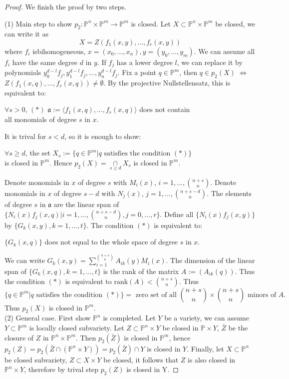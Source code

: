 \documentclass{amsart}
\theoremstyle{plain}
\theoremstyle{definition}
\theoremstyle{remark}
\numberwithin{equation}{section}
\begin{document}
 \begin{proof}
 	We finish the proof by two steps.
 	
 	(1) Main step to show $ p_2:\mathbb{P}^n\times \mathbb{P}^m\to \mathbb{P}^m $ is closed. Let $ X\subset\mathbb{P}^n\times\mathbb{P}^m $ be closed, we can write it as
 	$$
 	X=Z(f_1(x,y),\dots,f_r(x,y))
 	$$
 	where $ f_i $ isbihomogeneous, $ x=(x_0,\dots,x_n),y=(y_0,\dots,y_m) $. We can assume all $ f_i $ have the same degree $ d $ in $ y $. If $ f_j $ has a lower degree $ l $, we can replace it by polynomials $ y_0^{d-l}f_j,y_1^{d-l}f_j,\dots,y_n^{d-l}f_j $. Fix a point $ q\in\mathbb{P}^m $, then $ q\in p_2(X) $ $ \Leftrightarrow $ $ Z(f_1(x,q),\dots,f_r(x,q))\neq \emptyset $. By the projective Nullstellensatz, this is equivalent to:
 	\begin{center}
 		$ \forall s>0 $, $ (\ast) $ $ \mathfrak{a}:=\langle f_1(x,q),\dots,f_r(x,q)\rangle $ does not contain\\
 		all monomials of degree $ s $ in $ x $.
 	\end{center}
 	It is trival for $ s<d $, so it is enough to show:
 	\begin{center}
 		$ \forall s\geq d $, the set $X_s:= \{ q\in\mathbb{P}^m|q \text{ satisfies the condition } (\ast) \} $ \\
 		is closed in $ \mathbb{P}^m $.
 		Hence $ p_2(X)=\mathop{\cap}\limits_{s\geq d} X_s $ is closed in $ \mathbb{P}^m $.
 	\end{center}
 	Denote monomials in $ x $ of degree $ s $ with $ M_i(x) $, $ i=1,\dots,\binom{n+s}{n} $. Denote monomials in $ x $ of degree $ s-d $ with $ N_j(x) $, $ j=1,\dots,\binom{n+s-d}{n} $. The elements of degree $ s $ in $ \mathfrak{a} $ are the linear span of $ \{N_i(x)f_j(x,q)|i=1,\dots,\binom{n+s-d}{n},j=0,\dots,r\} $. Define all  $ \{N_i(x)f_j(x,y)\} $ by $ \{ G_k(x,y),k=1,\dots,t \} $. The condition $ (\ast) $ is equivalent to:
 	\begin{center}
 		$ \{ G_k(x,q) \} $ does not equal to the whole space of degree $ s $ in $ x $.
 	\end{center}
 	We can write $ G_k(x,y)=\sum\limits_{i=1}^{\binom{n+s}{n}} A_{ik}(y)M_i(x) $. The dimension of the linear span of $ \{G_k(x,q),k=1,\dots,t \}$ is the rank of the matrix $ A:=(A_{ik}(q)) $. Thus the condition $ (\ast) $ is equivalent to $ \text{rank}(A)<\binom{n+s}{n} $. Thus
 	$$
 	\{q\in\mathbb{P}^m|q \text{ satisfies the condition } (\ast) \}=\text{ zero set of all } \binom{n+s}{n}\times \binom{n+s}{n} \text{ minors of } A.
 	$$
 	Thus $ p_2(X) $ is closed in $ \mathbb{P}^m $.\\
 	(2) General case. First show $ \mathbb{P}^n $ is completed. Let $ Y $ be a variety, we can assume $ Y\subset \mathbb{P}^m $ is locally closed subvariety. Let $ Z\subset \mathbb{P}^n\times Y $ be closed in $ \mathbb{P}\times Y $, $ \bar{Z} $ be the closure of $ Z $ in $ \mathbb{P}^n\times\mathbb{P}^m $. Then $ p_2(\bar{Z}) $ is closed in $ \mathbb{P}^m $, hence $ p_2(Z)=p_2(\bar{Z}\cap (\mathbb{P}^n\times Y))=p_2(\bar{Z})\cap Y $ is closed in $ Y $. Finally, let $ X\subset \mathbb{P}^n $ be closed subvariety, $ Z\subset X\times Y $  be closed, it follows that $ Z $ is also closed in $ \mathbb{P}^n\times Y $, therefore by trival step $ p_2(Z) $ is closed in Y.
 \end{proof}
\end{document}

